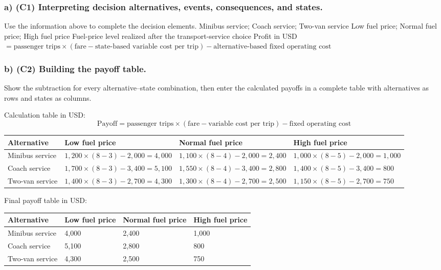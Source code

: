 \subsubsection*{a) \textbf{(C1)} Interpreting decision alternatives, events, consequences, and states.}
\label{subsec:problem18-after-school-transport-c1}
Use the information above to complete the decision elements.
\DecisionElementsTable
{Minibus service; Coach service; Two-van service}
{Low fuel price; Normal fuel price; High fuel price}
{Fuel-price level realized after the transport-service choice}
{Profit in USD $= \text{passenger trips} \times (\text{fare} - \text{state-based variable cost per trip}) - \text{alternative-based fixed operating cost}$}
\subsubsection*{b) \textbf{(C2)} Building the payoff table.}
\label{subsec:problem18-after-school-transport-c2}
Show the subtraction for every alternative--state combination, then enter the calculated payoffs in a complete table with alternatives as rows and states as columns.

Calculation table in USD:
\[
\text{Payoff}=\text{passenger trips}\times(\text{fare}-\text{variable cost per trip})-\text{fixed operating cost}
\]
\begin{center}
\small
\begin{tabular}{llll}
\toprule
Alternative & Low fuel price & Normal fuel price & High fuel price \\
\midrule
Minibus service & $1{,}200 \times (8 - 3) - 2{,}000 = 4{,}000$ & $1{,}100 \times (8 - 4) - 2{,}000 = 2{,}400$ & $1{,}000 \times (8 - 5) - 2{,}000 = 1{,}000$ \\
Coach service & $1{,}700 \times (8 - 3) - 3{,}400 = 5{,}100$ & $1{,}550 \times (8 - 4) - 3{,}400 = 2{,}800$ & $1{,}400 \times (8 - 5) - 3{,}400 = 800$ \\
Two-van service & $1{,}400 \times (8 - 3) - 2{,}700 = 4{,}300$ & $1{,}300 \times (8 - 4) - 2{,}700 = 2{,}500$ & $1{,}150 \times (8 - 5) - 2{,}700 = 750$ \\
\bottomrule
\end{tabular}
\end{center}

Final payoff table in USD:
\begin{center}
\begin{tabular}{llll}
\toprule
Alternative & Low fuel price & Normal fuel price & High fuel price \\
\midrule
Minibus service & 4{,}000 & 2{,}400 & 1{,}000 \\
Coach service & 5{,}100 & 2{,}800 & 800 \\
Two-van service & 4{,}300 & 2{,}500 & 750 \\
\bottomrule
\end{tabular}
\end{center}
